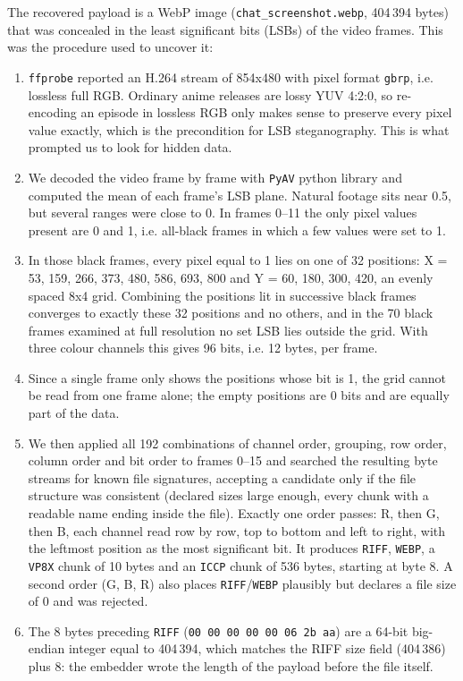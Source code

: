 \documentclass[11pt,a4paper,final,oneside]{article}
\begin{document}
\begin{itemize}
  The recovered payload is a WebP image (\texttt{chat\_screenshot.webp}, 404\,394 bytes) that was concealed in the least significant bits (LSBs) of the video frames. This was the procedure used to uncover it:
  \begin{enumerate}
    \item \texttt{ffprobe} reported an H.264 stream of 854x480 with pixel format \texttt{gbrp}, i.e. lossless full RGB. Ordinary anime releases are lossy YUV 4:2:0, so re-encoding an episode in lossless RGB only makes sense to preserve every pixel value exactly, which is the precondition for LSB steganography. This is what prompted us to look for hidden data.
    \item We decoded the video frame by frame with \texttt{PyAV} python library and computed the mean of each frame's LSB plane. Natural footage sits near 0.5, but several ranges were close to 0. In frames 0--11 the only pixel values present are 0 and 1, i.e. all-black frames in which a few values were set to 1.
    \item In those black frames, every pixel equal to 1 lies on one of 32 positions: X = 53, 159, 266, 373, 480, 586, 693, 800 and Y = 60, 180, 300, 420, an evenly spaced 8x4 grid. Combining the positions lit in successive black frames converges to exactly these 32 positions and no others, and in the 70 black frames examined at full resolution no set LSB lies outside the grid. With three colour channels this gives 96 bits, i.e. 12 bytes, per frame.
    \item Since a single frame only shows the positions whose bit is 1, the grid cannot be read from one frame alone; the empty positions are 0 bits and are equally part of the data.
    \item We then applied all 192 combinations of channel order, grouping, row order, column order and bit order to frames 0--15 and searched the resulting byte streams for known file signatures, accepting a candidate only if the file structure was consistent (declared sizes large enough, every chunk with a readable name ending inside the file). Exactly one order passes: R, then G, then B, each channel read row by row, top to bottom and left to right, with the leftmost position as the most significant bit. It produces \texttt{RIFF}, \texttt{WEBP}, a \texttt{VP8X} chunk of 10 bytes and an \texttt{ICCP} chunk of 536 bytes, starting at byte 8. A second order (G, B, R) also places \texttt{RIFF}/\texttt{WEBP} plausibly but declares a file size of 0 and was rejected.
    \item The 8 bytes preceding \texttt{RIFF} (\texttt{00 00 00 00 00 06 2b aa}) are a 64-bit big-endian integer equal to 404\,394, which matches the RIFF size field (404\,386) plus 8: the embedder wrote the length of the payload before the file itself.

\end{enumerate}
\end{itemize}
\end{document}
